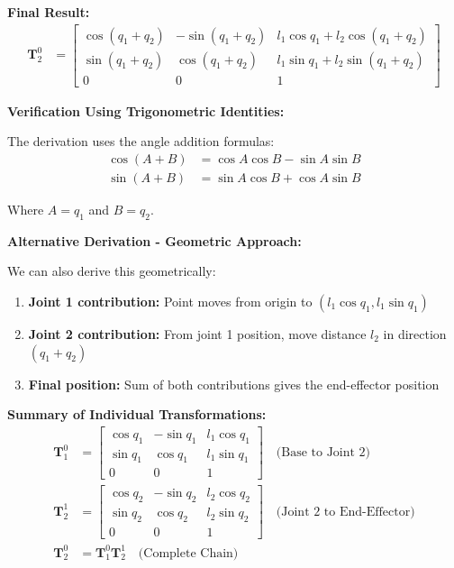 \documentclass[11pt,a4paper]{article}
\begin{document}
\textbf{Final Result:}
\begin{align}
\bm{T}_2^0 &= \begin{bmatrix}
\cos(q_1 + q_2) & -\sin(q_1 + q_2) & l_1\cos q_1 + l_2\cos(q_1 + q_2) \\
\sin(q_1 + q_2) & \cos(q_1 + q_2) & l_1\sin q_1 + l_2\sin(q_1 + q_2) \\
0 & 0 & 1
\end{bmatrix}
\end{align}

\textbf{Verification Using Trigonometric Identities:}

The derivation uses the angle addition formulas:
\begin{align}
\cos(A + B) &= \cos A \cos B - \sin A \sin B \\
\sin(A + B) &= \sin A \cos B + \cos A \sin B
\end{align}

Where $A = q_1$ and $B = q_2$.

\textbf{Alternative Derivation - Geometric Approach:}

We can also derive this geometrically:
\begin{enumerate}
    \item \textbf{Joint 1 contribution:} Point moves from origin to $(l_1\cos q_1, l_1\sin q_1)$
    \item \textbf{Joint 2 contribution:} From joint 1 position, move distance $l_2$ in direction $(q_1 + q_2)$
    \item \textbf{Final position:} Sum of both contributions gives the end-effector position
\end{enumerate}

\textbf{Summary of Individual Transformations:}
\begin{align}
\bm{T}_1^0 &= \begin{bmatrix}
\cos q_1 & -\sin q_1 & l_1 \cos q_1 \\
\sin q_1 & \cos q_1 & l_1 \sin q_1 \\
0 & 0 & 1
\end{bmatrix} \quad \text{(Base to Joint 2)} \\
\bm{T}_2^1 &= \begin{bmatrix}
\cos q_2 & -\sin q_2 & l_2 \cos q_2 \\
\sin q_2 & \cos q_2 & l_2 \sin q_2 \\
0 & 0 & 1
\end{bmatrix} \quad \text{(Joint 2 to End-Effector)} \\
\bm{T}_2^0 &= \bm{T}_1^0 \bm{T}_2^1 \quad \text{(Complete Chain)}
\end{align}
\end{document}
